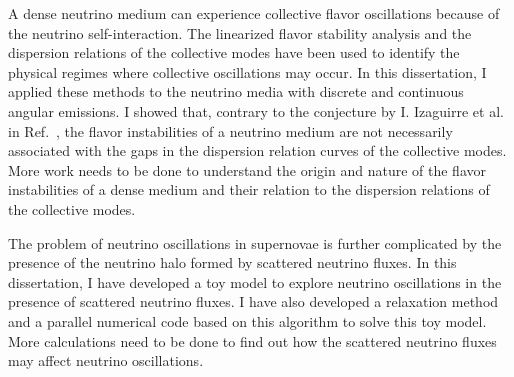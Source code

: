 A dense neutrino medium can experience collective flavor oscillations because of the neutrino self-interaction. The linearized flavor stability analysis and the dispersion relations of the collective modes have been used to identify the physical regimes where collective oscillations may occur. In this dissertation, I applied these methods to the neutrino media with discrete and continuous angular emissions. I showed that, contrary to the conjecture by I. Izaguirre et al. in Ref.~\cite{Izaguirre2016a}, the flavor instabilities of a neutrino medium are not necessarily associated with the gaps in the dispersion relation curves of the collective modes. More work needs to be done to understand the origin and nature of the flavor instabilities of a dense medium and their relation to the dispersion relations of the collective modes.


The problem of neutrino oscillations in supernovae is further complicated by the presence of the neutrino halo formed by scattered neutrino fluxes. In this dissertation, I have developed a toy model to explore neutrino oscillations in the presence of scattered neutrino fluxes. I have also developed a relaxation method and a parallel numerical code based on this algorithm to solve this toy model. More calculations need to be done to find out how the scattered neutrino fluxes may affect neutrino oscillations.


